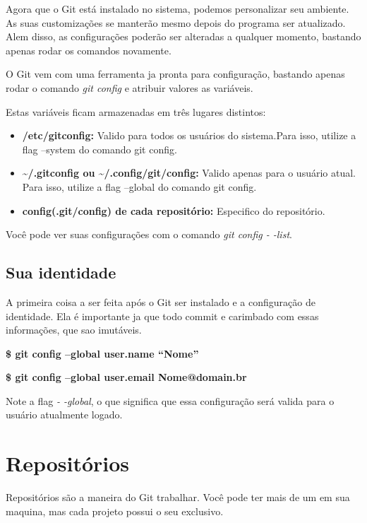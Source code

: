 \documentclass[]{article}
\begin{document}
Agora que o Git está instalado no sistema, podemos personalizar seu ambiente. 
As suas customizações se manterão mesmo depois do programa ser atualizado. 
Alem disso, as configurações poderão ser alteradas a qualquer momento, bastando apenas rodar os comandos novamente. 


O Git vem com uma ferramenta ja pronta para configuração, bastando apenas rodar o comando \textit{git config} e atribuir valores as variáveis.


Estas variáveis ficam armazenadas em três lugares distintos:


\begin{itemize}
    \item {\textbf{/etc/gitconfig:} } Valido para todos os usuários do sistema.Para isso, utilize a flag --system do comando git config.
    
    \item {\textbf{\textasciitilde/.gitconfig ou \textasciitilde/.config/git/config:} } Valido apenas para o usuário atual. Para isso, utilize a flag --global do comando git config.
    
    \item {\textbf{config(.git/config) de  cada repositório:} } Especifico  do repositório.
\end{itemize}
Você pode ver suas configurações com o comando \textit{git config - -list}.

\subsection*{Sua identidade}
A primeira coisa a ser feita  após o Git ser instalado e a configuração de identidade.
 Ela é importante ja que todo commit e carimbado com essas informações, que sao imutáveis.

\textbf{\$ git config --global user.name ``Nome'' }

\textbf{\$ git config --global user.email Nome@domain.br}

Note a flag \textit{- -global}, o que significa que essa configuração será valida para o usuário atualmente logado.

\section{Repositórios}

Repositórios são a maneira do Git  trabalhar. Você pode ter mais de um em sua maquina, mas cada projeto possui o seu exclusivo.
\end{document}
